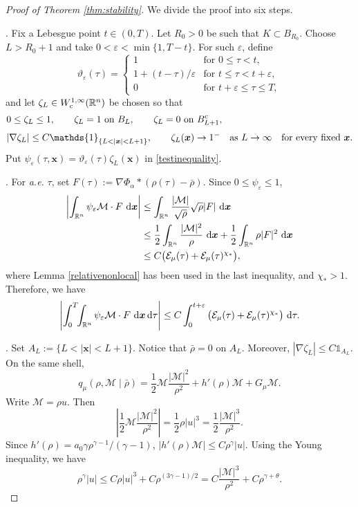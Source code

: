 \documentclass[reqno,11pt]{amsart}
\numberwithin{equation}{section}
\theoremstyle{definition}
\def\dd{{\, \rm d}}
\begin{document}
\bigskip
\begin{proof}[Proof of {\rm Theorem \ref{thm:stability}}]
We divide the proof into six steps.

. Fix a Lebesgue point $t\in(0,T)$.   Let $R_0>0$ be such that
$K\subset B_{R_0}$.  Choose $L>R_0+1$ and take
$0<\varepsilon<\min\{1,T-t\}$.  For such $\varepsilon$, define
\[
\vartheta_\varepsilon(\tau)=
\begin{cases}
1& \mbox{for $0\le\tau<t$},\\
1+(t-\tau)/\varepsilon& \mbox{for $t\le\tau<t+\varepsilon$},\\
0&\mbox{for $t+\varepsilon\le\tau\le T$},
\end{cases}
\]
and let $\zeta_L\in W^{1,\infty}_{\rm c}(\mathbb R^n)$ be chosen so that
\begin{align*}
&0\le \zeta_L\le1,
\qquad
\zeta_L=1\ \text{on }B_L,
\qquad
\zeta_L=0\ \text{on }B_{L+1}^{\rm c},\\[1mm]
&|\nabla\zeta_L|\le C\mathds{1}_{\{L<|\boldsymbol{x}|<L+1\}},
 \qquad
 \zeta_L(\boldsymbol{x}) \to 1^- 
 \quad\text{as }L\to\infty
 \quad\text{for every fixed }\boldsymbol{x}.
\end{align*}
Put $\psi_\varepsilon(\tau,\boldsymbol{x})=\vartheta_\varepsilon(\tau)\zeta_L(\boldsymbol{x})$ in \eqref{testinequality}.

. For {\it a.e.} $\tau$, set $F(\tau):=\nabla\Phi_\alpha*(\rho(\tau)-\bar\rho)$.  Since $0\le\psi_\varepsilon\le1$,
\[
\begin{aligned}
\left|\int_{\mathbb R^n}\psi_\varepsilon\mathcal M\cdot F\,\dd\boldsymbol{x}\right|
&\le
\int_{\mathbb R^n}\frac{|\mathcal M|}{\sqrt\rho}\sqrt\rho |F|\,\dd\boldsymbol{x}\\
&\le
\frac12\int_{\mathbb R^n}\frac{|\mathcal M|^2}{\rho}\,\dd\boldsymbol{x}
+\frac12\int_{\mathbb R^n}\rho |F|^2\,\dd\boldsymbol{x}\\
&\le C\big(\mathcal E_\mu(\tau)+\mathcal E_\mu(\tau)^{\chi_*}\big),
\end{aligned}
\]
where Lemma \ref{relativenonlocal} has been used in the last inequality, 
and $\chi_*>1$.  Therefore, we have
\begin{equation}\label{sourceestimate}
\left|\int_0^T\!\!\int_{\mathbb R^n}
\psi_\varepsilon\mathcal M\cdot F\,\dd\boldsymbol{x}\dd\tau\right|
\le C\int_0^{t+\varepsilon}
\big(\mathcal E_\mu(\tau)+\mathcal E_\mu(\tau)^{\chi_*}\big)\,\dd\tau.
\end{equation}

. Set $A_L:=\{L<|\boldsymbol{x}|<L+1\}$.  Notice that $\bar\rho=0$ on $A_L$. 
Moreover,
$
 |\nabla\zeta_L|\le C\mathds{1}_{A_L}.
$
On the same shell,
\[
 q_\mu(\rho,\mathcal M\mid\bar\rho)
=\frac12\mathcal M\frac{|\mathcal M|^2}{\rho^2}+h'(\rho)\mathcal M+G_\mu\mathcal M.
\]
Write $\mathcal M=\rho u$.  Then
\[
 \left|\frac12\mathcal M\frac{|\mathcal M|^2}{\rho^2}\right|
  =\frac12\rho |u|^3
  =\frac12\frac{|\mathcal M|^3}{\rho^2}.
\]
Since $h'(\rho)=a_0\gamma\rho^{\gamma-1}/(\gamma-1)$, $
 |h'(\rho)\mathcal M|
 \le C\rho^\gamma |u|.$
Using the Young inequality, we have
\[
\rho^\gamma|u|
 \le C\rho |u|^3+C\rho^{(3\gamma-1)/2}
 =C\frac{|\mathcal M|^3}{\rho^2}+C\rho^{\gamma+\theta}.
\]


\end{proof}
\end{document}
